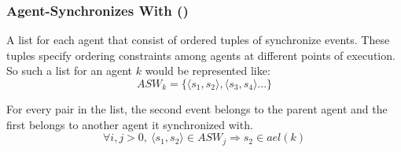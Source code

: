         \subsubsection{Agent-Synchronizes With ()}
        
            A list for each agent that consist of ordered tuples of synchronize events. These tuples specify ordering constraints among agents at different points of execution. So such a list for an agent $k$ would be represented like:  
                \[ASW_k = \{ \langle s_1, s_2 \rangle, \langle s_3, s_4 \rangle ...\}\]
        
            For every pair in the list, the second event belongs to the parent agent and the first belongs to another agent it synchronized with.
                \[  
                    \forall{i,j>0},\ 
                    \langle s_1, s_2 \rangle \in ASW_j 
                    \Rightarrow{} 
                    s_2 \in ael(k)                        
                \]
        
